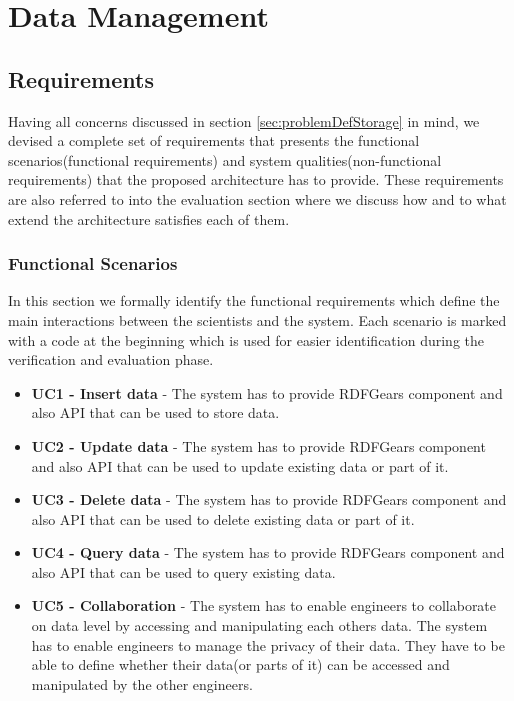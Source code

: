 \chapter{Data Management} 


\section{Requirements}
\label{sec:storageReq}

Having all concerns discussed in section \ref{sec:problemDefStorage} in mind, we devised a complete set of requirements that presents the functional scenarios(functional requirements) and system qualities(non-functional requirements) that the proposed architecture has to provide. These requirements are also referred to into the evaluation section where we discuss how and to what extend the architecture satisfies each of them.

\subsection{Functional Scenarios}
In this section we formally identify the functional requirements which define the main interactions between the scientists and the system. Each scenario is marked with a code at the beginning which is used for easier identification during the verification and evaluation phase.

\begin{itemize}

	\item \textbf{UC1 - Insert data} - The system has to provide RDFGears component and also API that can be used to store data.

	\item \textbf{UC2 - Update data } - The system has to provide RDFGears component and also API that can be used to update existing data or part of it.
	
	\item \textbf{UC3 - Delete data} - The system has to provide RDFGears component and also API that can be used to delete existing data or part of it.
	
	\item \textbf{UC4 - Query data} - The system has to provide RDFGears component and also API that can be used to query existing data.
	
	\item \textbf{UC5 - Collaboration} - The system has to enable engineers to collaborate on data level by accessing and manipulating each others data. The system has to enable engineers to manage the privacy of their data. They have to be able to define whether their data(or parts of it) can be accessed and manipulated by the other engineers.

\end{itemize}

